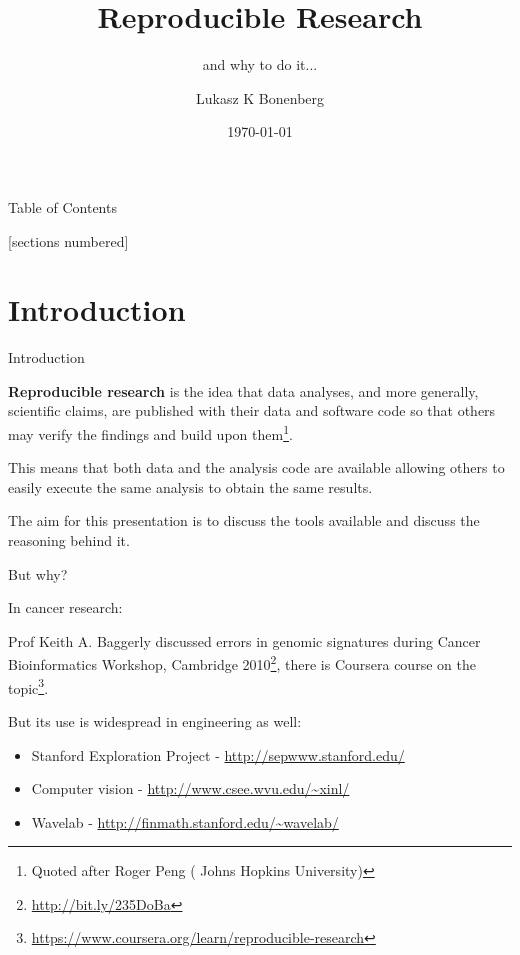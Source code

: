 \documentclass[11pt]{beamer}
\title[RR]{Reproducible Research}
\subtitle{and why to do it...}
\author{Lukasz K Bonenberg}
\institute{NGI}
\date{\today}
\begin{document}
\maketitle

\begin{frame}{Table of Contents}

  [sections numbered]
  \tableofcontents[hideallsubsections]
\end{frame}


\section{Introduction}

\begin{frame}[fragile]{Introduction}

\textbf{Reproducible research} is the idea that data analyses, and more generally, scientific claims, are published with their data and software code so that others may verify the findings and build upon them\footnote[frame]{Quoted after Roger Peng (
Johns Hopkins University)}.

\bigskip
This means that both data and the analysis code are available allowing others to easily execute the same analysis to obtain the same results.

\bigskip
The aim for this presentation is to discuss the tools available and discuss the reasoning behind it.
\end{frame}

\begin{frame}[fragile]{But why?}

In cancer research:

Prof Keith A. Baggerly discussed errors in genomic signatures during Cancer Bioinformatics Workshop, Cambridge 2010\footnote{\url{http://bit.ly/235DoBa}}, there is Coursera course on the topic\footnote{\url{https://www.coursera.org/learn/reproducible-research}}.

But its use is widespread in engineering as well:

\begin{itemize}
	\item Stanford Exploration Project - \url{http://sepwww.stanford.edu/}
	\item Computer vision - \url{http://www.csee.wvu.edu/~xinl/}
	\item Wavelab - \url{http://finmath.stanford.edu/~wavelab/}

\end{itemize}

\end{frame}
\end{document}
